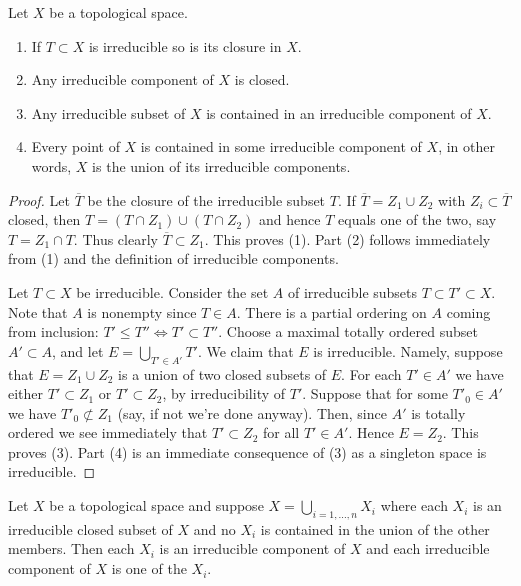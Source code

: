 \begin{lemma}
\label{lemma-irreducible}
Let $X$ be a topological space.
\begin{enumerate}
\item If $T \subset X$ is irreducible so is its closure in $X$.
\item Any irreducible component of $X$ is closed.
\item Any irreducible subset of $X$ is contained in an
irreducible component of $X$.
\item Every point of $X$ is contained in some irreducible component
of $X$, in other words, $X$ is the union of its irreducible components.
\end{enumerate}
\end{lemma}

\begin{proof}
Let $\overline{T}$ be the closure of the irreducible subset $T$.
If $\overline{T} = Z_1 \cup Z_2$ with $Z_i \subset \overline{T}$
closed, then $T = (T\cap Z_1) \cup (T \cap Z_2)$ and hence
$T$ equals one of the two, say $T = Z_1 \cap T$. Thus clearly
$\overline{T} \subset Z_1$. This proves (1). Part (2) follows
immediately from (1) and the definition of irreducible components.

\medskip\noindent
Let $T \subset X$ be irreducible. Consider the set $A$ of irreducible subsets
$T \subset T' \subset X$. Note that $A$ is nonempty since
$T \in A$. There is a partial ordering on $A$ coming from
inclusion: $T' \leq T'' \Leftrightarrow T' \subset T''$.
Choose a maximal totally ordered subset $A' \subset A$, and let
$E = \bigcup_{T' \in A'} T'$. We claim that $E$ is
irreducible. Namely, suppose that $E =  Z_1 \cup Z_2$ is a union
of two closed subsets of $E$. For each $T' \in A'$ we have
either $T' \subset Z_1$ or $T' \subset Z_2$, by irreducibility
of $T'$. Suppose that for some $T'_0 \in A'$ we have
$T'_0 \not\subset Z_1$ (say, if not we're done anyway).
Then, since $A'$ is totally ordered we see immediately that
$T' \subset Z_2$ for all $T' \in A'$. Hence $E = Z_2$.
This proves (3). Part (4) is an immediate consequence of (3)
as a singleton space is irreducible.
\end{proof}

\begin{lemma}
\label{lemma-pick-irreducible-components}
Let $X$ be a topological space and suppose $X = \bigcup_{i = 1, \ldots, n} X_i$
where each $X_i$ is an irreducible closed subset of $X$ and no $X_i$
is contained in the union of the other members.  Then each $X_i$ is an
irreducible component of $X$ and each irreducible component of $X$
is one of the $X_i$.
\end{lemma}

